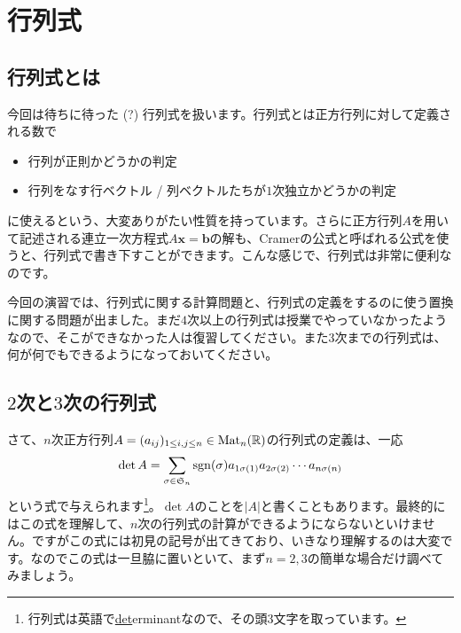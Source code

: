 \chapter{行列式}

\section{行列式とは}

今回は待ちに待った (?) 行列式を扱います。行列式とは正方行列に対して定義される数で
\begin{itemize}
\item 行列が正則かどうかの判定
\item 行列をなす行ベクトル / 列ベクトルたちが$1$次独立かどうかの判定
\end{itemize}
に使えるという、大変ありがたい性質を持っています。さらに正方行列$A$を用いて記述される連立一次方程式$A\bm{x} = \bm{b}$の解も、Cramerの公式と呼ばれる公式を使うと、行列式で書き下すことができます。こんな感じで、行列式は非常に便利なのです。

今回の演習では、行列式に関する計算問題と、行列式の定義をするのに使う置換に関する問題が出ました。まだ$4$次以上の行列式は授業でやっていなかったようなので、そこができなかった人は復習してください。また$3$次までの行列式は、何が何でもできるようになっておいてください。

\section{$2$次と$3$次の行列式}

さて、$n$次正方行列$A = (a_{ij})_{1\leq i, j\leq n} \in \operatorname{Mat}_n(\mathbb{R})$の行列式の定義は、一応
\[
\det A = \sum_{\sigma \in \mathfrak{S}_n} \operatorname{sgn}(\sigma) a_{1 \sigma(1)} a_{2 \sigma(2)} \cdots a_{n \sigma(n)}
\]
という式で与えられます\footnote{行列式は英語で\uline{det}erminantなので、その頭$3$文字を取っています。}。$\det A$のことを$|A|$と書くこともあります。最終的にはこの式を理解して、$n$次の行列式の計算ができるようにならないといけません。ですがこの式には初見の記号が出てきており、いきなり理解するのは大変です。なのでこの式は一旦脇に置いといて、まず$n = 2, 3$の簡単な場合だけ調べてみましょう。

